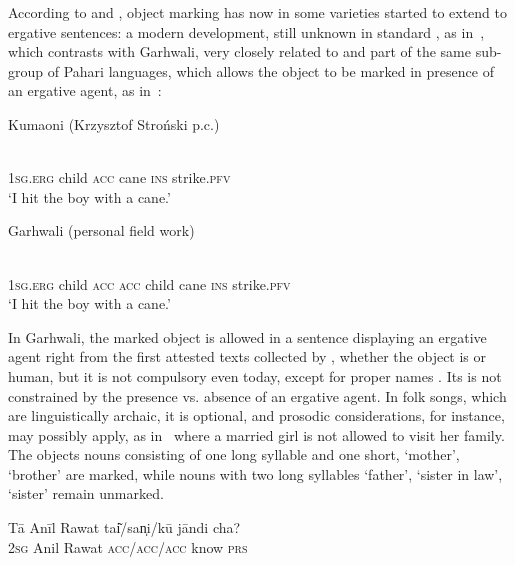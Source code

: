 \documentclass[output=paper]{LSP/langsci}
\begin{document}
According to \citet{Stronski2013Evolution} and \citet{Sharma1987Formation}, object marking has now in some varieties started to extend to ergative sentences: a modern development, still unknown in standard , as in~, which contrasts with Garhwali, very closely related to  and part of the same sub-group of Pahari languages, which allows the object to be marked in presence of an ergative agent, as in~: 

\ea Kumaoni (Krzysztof Stroński p.c.) \label{10-mo-ex:51}

\ea \label{10-mo-ex:51a}
\\
\textsc{1sg.erg} child \textsc{acc} cane \textsc{ins} strike.\textsc{pfv}\\
\glt ‘I hit the boy with a cane.’ 
\z

\ea Garhwali (personal field work) \label{10-mo-ex:51b}

\\
\textsc{1sg.erg} child \textsc{acc} { } \textsc{acc}  child cane \textsc{ins} strike.\textsc{pfv}\\
\glt ‘I hit the boy with a cane.’
\z
\z

In Garhwali, the marked object is allowed in a sentence displaying an ergative agent right from the first attested texts collected by \citet{Grierson1903Linguistic} , whether the object is  or human, but it is not compulsory even today, except for proper names . Its  is not constrained by the presence vs. absence of an ergative agent. In folk songs, which are linguistically archaic, it is optional, and prosodic considerations, for instance, may possibly apply, as in~ where a married girl is not allowed to visit her family. The objects nouns consisting of one long syllable and one short, ‘mother’, ‘brother’ are marked, while nouns with two long syllables ‘father’, ‘sister in law’, ‘sister’ remain unmarked.

\ea
\label{10-mo-ex:53}
\gll Tā Anīl Rawat tai͂/san̩i/kū jāndi cha?\\
 \textsc{2sg} Anil Rawat \textsc{acc}/\textsc{acc}/\textsc{acc} know \textsc{prs}\\
 
\end{document}
